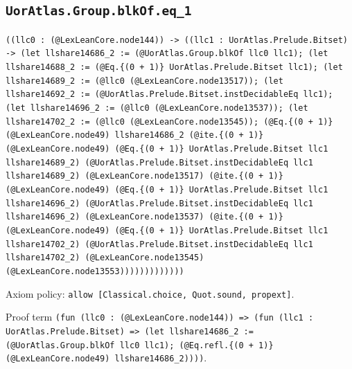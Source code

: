 \documentclass[11pt]{article}
\begin{document}
\subsection*{\texttt{UorAtlas.Group.blkOf.eq\_1}}
\noindent\texttt{((llc0 : (@LexLeanCore.node144)) -> ((llc1 : UorAtlas.Prelude.Bitset) -> (let llshare14686\_2 := (@UorAtlas.Group.blkOf llc0 llc1); (let llshare14688\_2 := (@Eq.\{(0 + 1)\} UorAtlas.Prelude.Bitset llc1); (let llshare14689\_2 := (@llc0 (@LexLeanCore.node13517)); (let llshare14692\_2 := (@UorAtlas.Prelude.Bitset.instDecidableEq llc1); (let llshare14696\_2 := (@llc0 (@LexLeanCore.node13537)); (let llshare14702\_2 := (@llc0 (@LexLeanCore.node13545)); (@Eq.\{(0 + 1)\} (@LexLeanCore.node49) llshare14686\_2 (@ite.\{(0 + 1)\} (@LexLeanCore.node49) (@Eq.\{(0 + 1)\} UorAtlas.Prelude.Bitset llc1 llshare14689\_2) (@UorAtlas.Prelude.Bitset.instDecidableEq llc1 llshare14689\_2) (@LexLeanCore.node13517) (@ite.\{(0 + 1)\} (@LexLeanCore.node49) (@Eq.\{(0 + 1)\} UorAtlas.Prelude.Bitset llc1 llshare14696\_2) (@UorAtlas.Prelude.Bitset.instDecidableEq llc1 llshare14696\_2) (@LexLeanCore.node13537) (@ite.\{(0 + 1)\} (@LexLeanCore.node49) (@Eq.\{(0 + 1)\} UorAtlas.Prelude.Bitset llc1 llshare14702\_2) (@UorAtlas.Prelude.Bitset.instDecidableEq llc1 llshare14702\_2) (@LexLeanCore.node13545) (@LexLeanCore.node13553)))))))))))))}\par
\noindent Axiom policy: \texttt{allow [Classical.choice, Quot.sound, propext]}.\par
\noindent Proof term \texttt{(fun (llc0 : (@LexLeanCore.node144)) => (fun (llc1 : UorAtlas.Prelude.Bitset) => (let llshare14686\_2 := (@UorAtlas.Group.blkOf llc0 llc1); (@Eq.refl.\{(0 + 1)\} (@LexLeanCore.node49) llshare14686\_2))))}.\par
\end{document}
